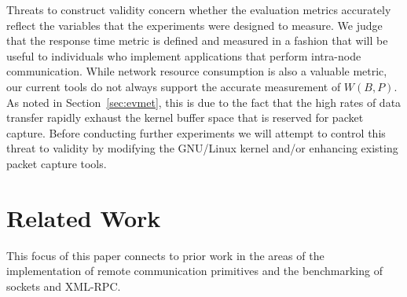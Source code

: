 \documentclass{sig-alternate}
\begin{document}
Threats to construct validity concern whether the evaluation metrics
accurately reflect the variables that the experiments were designed to
measure.  We judge that the response time metric is defined and
measured in a fashion that will be useful to individuals who implement
applications that perform intra-node communication.  While network
resource consumption is also a valuable metric, our current tools do
not always support the accurate measurement of $W(B, P)$.  As noted in
Section~\ref{sec:evmet}, this is due to the fact that the high rates
of data transfer rapidly exhaust the kernel buffer space that is
reserved for packet capture.  Before conducting further experiments we
will attempt to control this threat to validity by modifying the
GNU/Linux kernel and/or enhancing existing packet capture tools.

\vspace*{-.1in}

\section{Related Work}
\label{sec:related-work}

This focus of this paper connects to prior work in the areas of the
implementation of remote communication primitives and the benchmarking
of sockets and XML-RPC.




\end{document}
